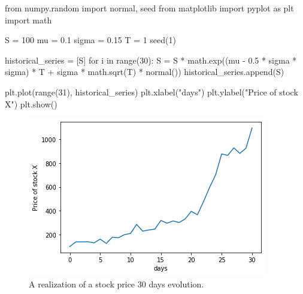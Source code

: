 \cprotEnv\begin{solution}
\begin{ipython}
from numpy.random import normal, seed
from matplotlib import pyplot as plt
import math

S = 100
mu = 0.1
sigma = 0.15
T = 1
seed(1)

historical_series = [S]
for i in range(30):
    S = S * math.exp((mu - 0.5 * sigma * sigma) * T +
        sigma * math.sqrt(T) * normal())
    historical_series.append(S)

plt.plot(range(31), historical_series)
plt.xlabel("days")
plt.ylabel("Price of stock X")
plt.show()
\end{ipython}

\begin{figure}[!htb]
\begin{center}
  \includegraphics[width=0.7\linewidth]{figures/lesson6_solutions_5_0.png}
\end{center}
\caption{A realization of a stock price 30 days evolution.} 
\end{figure}
\end{solution}
